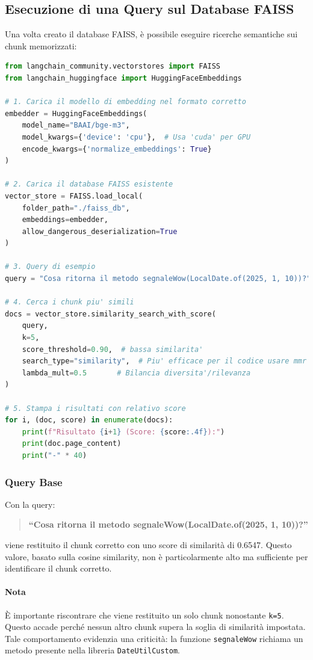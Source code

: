 \documentclass[12pt,a4paper,openright,twoside]{book}
\begin{document}
\subsection{Esecuzione di una Query sul Database FAISS}
Una volta creato il database FAISS, è possibile eseguire ricerche semantiche sui chunk memorizzati:

\begin{lstlisting}[language=Python, caption={Codice Python per l'esecuzione di una query sul database FAISS}, label={lst:query}]
    from langchain_community.vectorstores import FAISS
from langchain_huggingface import HuggingFaceEmbeddings

# 1. Carica il modello di embedding nel formato corretto
embedder = HuggingFaceEmbeddings(
    model_name="BAAI/bge-m3",
    model_kwargs={'device': 'cpu'},  # Usa 'cuda' per GPU
    encode_kwargs={'normalize_embeddings': True}
)

# 2. Carica il database FAISS esistente
vector_store = FAISS.load_local(
    folder_path="./faiss_db",
    embeddings=embedder,
    allow_dangerous_deserialization=True
)

# 3. Query di esempio
query = "Cosa ritorna il metodo segnaleWow(LocalDate.of(2025, 1, 10))?"

# 4. Cerca i chunk piu' simili
docs = vector_store.similarity_search_with_score(
    query,
    k=5,
    score_threshold=0.90,  # bassa similarita'
    search_type="similarity",  # Piu' efficace per il codice usare mmr per diversita'
    lambda_mult=0.5       # Bilancia diversita'/rilevanza
)

# 5. Stampa i risultati con relativo score
for i, (doc, score) in enumerate(docs):
    print(f"Risultato {i+1} (Score: {score:.4f}):")
    print(doc.page_content)
    print("-" * 40)
\end{lstlisting}

\subsubsection{Query Base}
Con la query: 
\begin{quote}
    \textbf{``Cosa ritorna il metodo segnaleWow(LocalDate.of(2025, 1, 10))?''}
\end{quote}
viene restituito il chunk corretto con uno score di similarità di 0.6547. Questo valore, basato sulla cosine similarity, non è particolarmente alto ma sufficiente per identificare il chunk corretto.

\paragraph{Nota}
È importante riscontrare che viene restituito un solo chunk nonostante \texttt{k=5}. Questo accade perché nessun altro chunk supera la soglia di similarità impostata. Tale comportamento evidenzia una criticità: la funzione \texttt{segnaleWow} richiama un metodo presente nella libreria \texttt{DateUtilCustom}.
\end{document}
